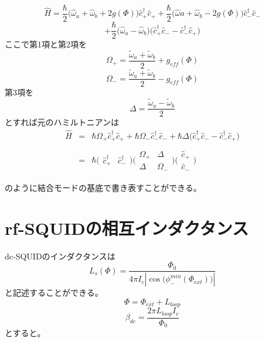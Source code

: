 \begin{equation}
    \hat{H}=\frac{\hbar}{2}\biggl(\hat{\omega}_{a}+\hat{\omega}_{b}+2 g(\Phi)\biggr) \hat{c}_{+}^{\dagger} \hat{c}_{+}+\frac{\hbar}{2}\biggl(\hat{\omega} a+\hat{\omega}_{b}-2 g(\Phi)\biggr) \hat{c}_{-}^{\dagger} \hat{c}_{-}
\end{equation}
\begin{equation}
    +\frac{\hbar}{2}\biggl(\hat{\omega}_{a}-\hat{\omega}_{b}\biggr)\biggl(\hat{c}_{+}^{\dagger}\hat{c}_{-}-\hat{c}_{-}^{\dagger} \hat{c}_{+}\biggr)
\end{equation}
ここで第1項と第2項を
\begin{equation}
    \Omega_{+}=\frac{\tilde{\omega}_{a}+\tilde{\omega}_{b}}{2} + g_{eff}(\Phi)
\end{equation}
\begin{equation}
    \Omega_{-}=\frac{\tilde{\omega}_{a}+\tilde{\omega}_{b}}{2} - g_{eff}(\Phi)
\end{equation}
第3項を
\begin{equation}
    \Delta = \frac{\tilde{\omega}_{a}-\tilde{\omega}_{b}}{2}
\end{equation}
とすれば元のハミルトニアンは
\begin{eqnarray}
    \hat{H}&=&\hbar\Omega_{+} \hat{c}_{+}^{\dagger} \hat{c}_{+}+\hbar\Omega_{-} \hat{c}_{-}^{\dagger} \hat{c}_{-} +\hbar \Delta \biggl(\hat{c}_{+}^{\dagger}\hat{c}_{-}-\hat{c}_{-}^{\dagger} \hat{c}_{+}\biggr)\\ \\ 
    &=& \hbar\biggl(\begin{array}{cc}
        \hat{c}_{+}^{\dagger} & \hat{c}_{-}^{\dagger}
        \end{array}\biggr)\biggl(\begin{array}{cc}
        \Omega_{+} & \Delta \\
        \Delta & \Omega_{-}
        \end{array}\biggr)\biggl(\begin{array}{l}
        \hat{c}_{+} \\
        \hat{c}_{-}
        \end{array}\biggr)
\end{eqnarray}

のように結合モードの基底で書き表すことができる。

\section{rf-SQUIDの相互インダクタンス}
dc-SQUIDのインダクタンスは
\begin{equation}
    L_{s}(\Phi)=\frac{\Phi_0}{4\pi I_{c}|{\cos({\phi_{-}^{min}(\Phi_{ext})}})|}
\end{equation}
と記述することができる。
\begin{equation}
    \Phi=\Phi_{ext}+L_{loop}
\end{equation}
\begin{equation}
    \beta_{dc}=\frac{2\pi L_{loop} I_{c}}{\Phi_{0}}
\end{equation}
とすると。
